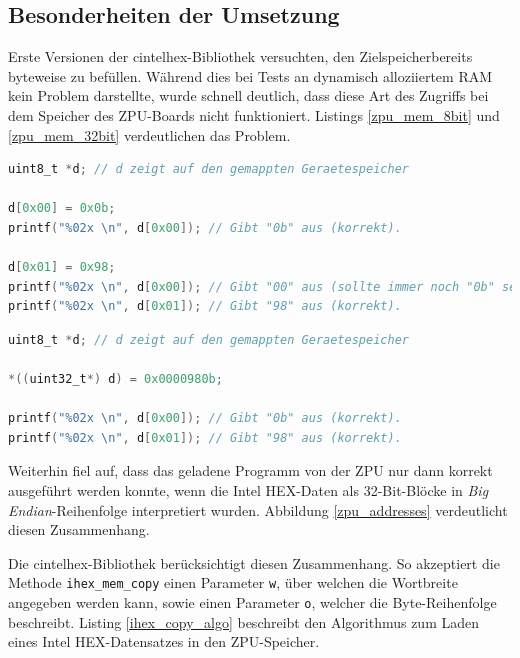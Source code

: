 \documentclass[11pt]{scrartcl}
\begin{document}
\subsection{Besonderheiten der Umsetzung}


Erste Versionen der cintelhex-Bibliothek versuchten, den Zielspeicherbereits byteweise zu befüllen. Während dies bei Tests an dynamisch alloziiertem RAM kein Problem darstellte, wurde schnell deutlich, dass diese Art des Zugriffs bei dem Speicher des ZPU-Boards nicht funktioniert. Listings \ref{zpu_mem_8bit} und \ref{zpu_mem_32bit} verdeutlichen das Problem.

\begin{lstlisting}[float=p,language=C,caption=Unerwartetes Verhalten des ZPU-Speichers bei 8-Bit-Zugriff,morekeywords={uint8_t,uint32_t},label=zpu_mem_8bit]
uint8_t *d; // d zeigt auf den gemappten Geraetespeicher

d[0x00] = 0x0b;
printf("%02x \n", d[0x00]); // Gibt "0b" aus (korrekt).

d[0x01] = 0x98;
printf("%02x \n", d[0x00]); // Gibt "00" aus (sollte immer noch "0b" sein)!
printf("%02x \n", d[0x01]); // Gibt "98" aus (korrekt).
\end{lstlisting}

\begin{lstlisting}[float=p,language=C,caption=Korrektes Verhalten des ZPU-Speichers bei 32-Bit-Zugriff,morekeywords={uint8_t,uint32_t},label=zpu_mem_32bit]
uint8_t *d; // d zeigt auf den gemappten Geraetespeicher

*((uint32_t*) d) = 0x0000980b;

printf("%02x \n", d[0x00]); // Gibt "0b" aus (korrekt).
printf("%02x \n", d[0x01]); // Gibt "98" aus (korrekt).
\end{lstlisting}

Weiterhin fiel auf, dass das geladene Programm von der ZPU nur dann korrekt ausgeführt werden konnte, wenn die Intel HEX-Daten als 32-Bit-Blöcke in \emph{Big Endian}-Reihenfolge interpretiert wurden. Abbildung  \ref{zpu_addresses} verdeutlicht diesen Zusammenhang.

Die cintelhex-Bibliothek berücksichtigt diesen Zusammenhang. So akzeptiert die Methode \texttt{ihex\_mem\_copy} einen Parameter \texttt{w}, über welchen die Wortbreite angegeben werden kann, sowie einen Parameter \texttt{o}, welcher die Byte-Reihenfolge beschreibt. Listing \ref{ihex_copy_algo} beschreibt den Algorithmus zum Laden eines Intel HEX-Datensatzes in den ZPU-Speicher.
\end{document}
